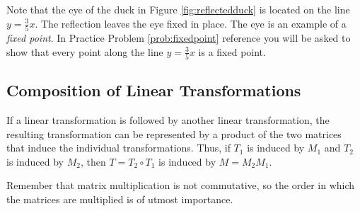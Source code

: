 \documentclass{ximera}
\newcommand{\RR}{\mathbb{R}}
\newcommand{\dfn}{\textit}
\begin{document}
Note that the eye of the duck in Figure \ref{fig:reflectedduck} is located on the line $y=\frac{3}{5}x$.  The reflection leaves the eye fixed in place.  The eye is an example of a \dfn{fixed point}.  In Practice Problem \ref{prob:fixedpoint} {\color{red} reference} you will be asked to show that every point along the line $y=\frac{3}{5}x$ is a fixed point.

\subsection*{Composition of Linear Transformations}

If a linear transformation is followed by another linear transformation, the resulting transformation can be represented by a product of the two matrices that induce the individual transformations.  Thus, if $T_1$ is induced by $M_1$ and $T_2$ is induced by $M_2$, then $T=T_2\circ T_1$ is induced by $M=M_2M_1$.

\begin{center}
\end{center}

Remember that matrix multiplication is not commutative, so the order in which the matrices are multiplied is of utmost importance.
\end{document}
